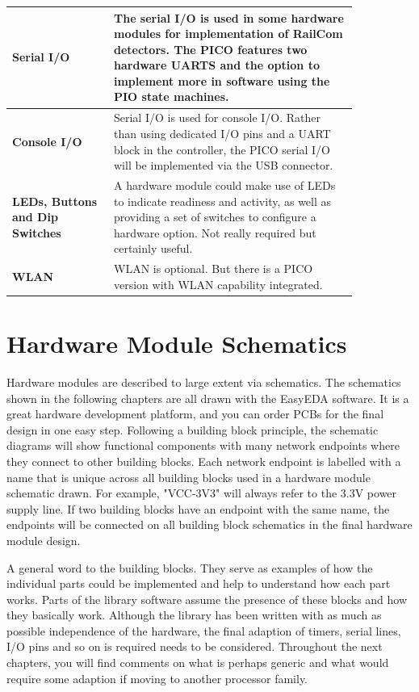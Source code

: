 \begin{longtable}{@{}p{0.25\linewidth}p{0.6\linewidth}@{}}
    \midrule
    \textbf{Serial I/O} & The serial I/O is used in some hardware modules for implementation of RailCom detectors. The PICO features two hardware UARTS and the option to implement more in software using the PIO state machines. \\
    \midrule
    \textbf{Console I/O} & Serial I/O is used for console I/O. Rather than using dedicated I/O pins and a UART block in the controller, the PICO serial I/O will be implemented via the USB connector. \\
    \midrule
    \textbf{LEDs, Buttons and Dip Switches} & A hardware module could make use of LEDs to indicate readiness and activity, as well as providing a set of switches to configure a hardware option. Not really required but certainly useful. \\
    \midrule
    \textbf{WLAN} & WLAN is optional. But there is a PICO version with WLAN capability integrated. \\
\end{longtable}

\section{Hardware Module Schematics}

Hardware modules are described to large extent via schematics. The schematics shown in the following chapters are all drawn with the EasyEDA software. It is a great hardware development platform, and you can order PCBs for the final design in one easy step. Following a building block principle, the schematic diagrams will show functional components with many network endpoints where they connect to other building blocks. Each network endpoint is labelled with a name that is unique across all building blocks used in a hardware module schematic drawn. For example, "VCC-3V3" will always refer to the 3.3V power supply line. If two building blocks have an endpoint with the same name, the endpoints will be connected on all building block schematics in the final hardware module design.

A general word to the building blocks. They serve as examples of how the individual parts could be implemented and help to understand how each part works. Parts of the library software assume the presence of these blocks and how they basically work. Although the library has been written with as much as possible independence of the hardware, the final adaption of timers, serial lines, I/O pins and so on is required needs to be considered. Throughout the next chapters, you will find comments on what is perhaps generic and what would require some adaption if moving to another processor family.

